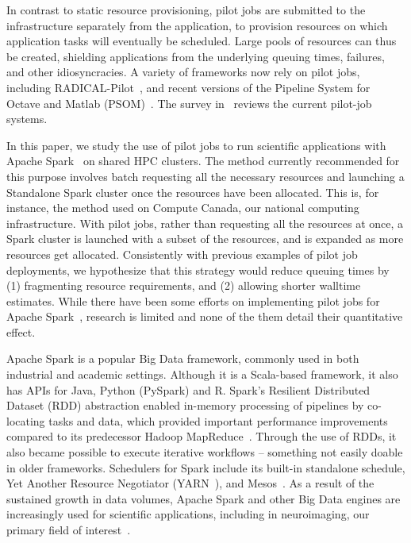 \documentclass{IEEEtran}
\begin{document}
In contrast to static resource provisioning, pilot jobs are submitted to
the infrastructure separately from the application, to provision resources
on which application tasks will eventually be scheduled. Large pools of
resources can thus be created, shielding applications from the underlying
queuing times, failures, and other idiosyncracies. A variety of frameworks
now rely on pilot jobs, including RADICAL-Pilot~\cite{merzky2015radical},
and recent versions of the Pipeline System for Octave and Matlab
(PSOM)~\cite{bellec2012pipeline}. The survey in~\cite{turilli2018comprehensive} reviews
the current pilot-job systems.

In this paper, we study the use of pilot jobs to run scientific
applications with Apache Spark~\cite{zaharia2016apache} on shared HPC
clusters. The method currently recommended for this purpose involves batch
requesting all the
necessary resources and launching a Standalone Spark cluster once the
resources have been allocated. This is, for instance, the method used on
Compute Canada,
 our national computing infrastructure. With pilot
jobs, rather than requesting all the resources at once, a Spark cluster is
launched with a subset of the resources, and is expanded as more resources
get allocated. Consistently with previous examples of pilot job
deployments, we hypothesize that this strategy would reduce queuing times
by (1) fragmenting resource requirements, and (2) allowing shorter walltime
estimates. While there have been some efforts on implementing pilot jobs
for Apache Spark~\cite{luckow2016hadoop}, research is limited and
none of the them detail their quantitative effect.

Apache Spark is a popular Big Data framework, commonly used in both
industrial and academic settings. Although it is a Scala-based framework,
it also has APIs for Java, Python (PySpark) and R. Spark's Resilient
Distributed Dataset (RDD) abstraction enabled in-memory processing of
pipelines by co-locating tasks and data, which provided important
performance improvements compared to its predecessor Hadoop
MapReduce~\cite{dean2008mapreduce}. Through the use of RDDs, it also became possible
to execute iterative workflows -- something not easily doable in older
frameworks. Schedulers for Spark include its built-in standalone schedule,
Yet Another Resource Negotiator (YARN~\cite{apache13yet}), and Mesos~\cite{hindman2011mesos}. As a
result of the sustained growth in data volumes, Apache Spark and other
Big Data engines are increasingly used for scientific applications,
including in neuroimaging, our primary field of
interest~\cite{boubela2016big,mehta2017comparative,freeman2014mapping}.
\end{document}
